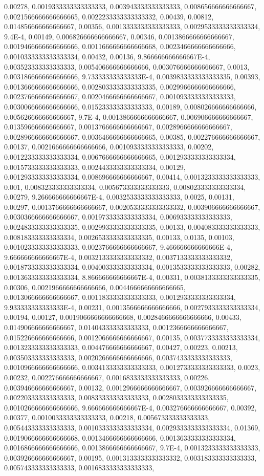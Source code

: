 0.00278, 0.0019333333333333333, 0.003943333333333333, 0.008656666666666667, 0.0021566666666666665, 0.0022233333333333332, 0.00439, 0.00812, 0.014856666666666667, 0.00356, 0.0013333333333333333, 0.0029533333333333334, 9.4E-4, 0.00149, 0.006826666666666667, 0.00346, 0.0013866666666666667, 0.0019466666666666666, 0.0011666666666666668, 0.0023466666666666666, 0.0010333333333333334, 0.00432, 0.00136, 9.866666666666667E-4, 0.003523333333333333, 0.005406666666666666, 0.003076666666666667, 0.0013, 0.0031866666666666666, 9.733333333333333E-4, 0.0039833333333333335, 0.00393, 0.0013666666666666666, 0.0028033333333333335, 0.0029966666666666666, 0.0023766666666666667, 0.0020466666666666667, 0.0010933333333333333, 0.0030066666666666666, 0.015233333333333333, 0.00189, 0.008026666666666666, 0.005626666666666667, 9.7E-4, 0.0013866666666666667, 0.006906666666666667, 0.013596666666666667, 0.0013766666666666667, 0.0028966666666666667, 0.0028966666666666667, 0.0036466666666666665, 0.00385, 0.002276666666666667, 0.00137, 0.0021666666666666666, 0.0010933333333333333, 0.00202, 0.0012233333333333334, 0.0067666666666666665, 0.0012933333333333334, 0.0015733333333333333, 0.0024433333333333334, 0.00129, 0.0012933333333333334, 0.008696666666666667, 0.00414, 0.0013233333333333333, 0.001, 0.008323333333333334, 0.005673333333333333, 0.008023333333333334, 0.00279, 9.266666666666667E-4, 0.0032533333333333333, 0.0025, 0.00131, 0.00297, 0.0013766666666666667, 0.0020533333333333332, 0.003906666666666667, 0.0030366666666666667, 0.0019733333333333334, 0.006933333333333333, 0.0024833333333333335, 0.0029933333333333335, 0.00133, 0.004083333333333333, 0.008183333333333334, 0.0026533333333333335, 0.00133, 0.0135, 0.00103, 0.0010233333333333333, 0.0023766666666666667, 9.466666666666666E-4, 9.666666666666667E-4, 0.0032133333333333332, 0.0037133333333333332, 0.0018733333333333334, 0.004003333333333334, 0.0013533333333333333, 0.00282, 0.0013633333333333334, 8.866666666666667E-4, 0.00331, 0.0038133333333333335, 0.00306, 0.0021966666666666666, 0.0044666666666666665, 0.0013066666666666667, 0.0011833333333333333, 0.0012933333333333334, 9.933333333333333E-4, 0.00231, 0.0013566666666666666, 0.0027933333333333334, 0.00194, 0.00127, 0.0019066666666666668, 0.0028466666666666666, 0.00433, 0.014906666666666667, 0.014043333333333333, 0.0012366666666666667, 0.015226666666666666, 0.0012066666666666667, 0.00135, 0.0037733333333333334, 0.0013233333333333333, 0.004476666666666667, 0.00427, 0.00223, 0.00213, 0.003503333333333333, 0.0020266666666666666, 0.0037433333333333333, 0.0010966666666666666, 0.0034133333333333333, 0.0012733333333333333, 0.0023, 0.00232, 0.002276666666666667, 0.0016833333333333333, 0.00226, 0.003946666666666667, 0.00132, 0.0012966666666666667, 0.003926666666666667, 0.002203333333333333, 0.008333333333333333, 0.0028033333333333335, 0.0010266666666666666, 9.666666666666667E-4, 0.003276666666666667, 0.00392, 0.00377, 0.0010033333333333333, 0.00218, 0.005673333333333333, 0.005443333333333333, 0.0010333333333333334, 0.0029333333333333334, 0.01369, 0.0019066666666666668, 0.0013466666666666666, 0.0013633333333333334, 0.0016866666666666666, 0.0013866666666666667, 9.7E-4, 0.0013233333333333333, 0.003926666666666667, 0.00195, 0.0013133333333333332, 0.003183333333333333, 0.005743333333333333, 0.0016833333333333333, 